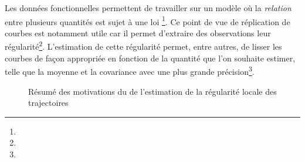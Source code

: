 
Les données fonctionnelles permettent de travailler sur un modèle où la \emph{relation} entre plusieurs quantités est sujet à une loi \footnote{}. Ce point de vue de réplication de courbes est notamment utile car il permet d'extraire des observations leur régularité\footnote{}. L'estimation de cette régularité permet, entre autres, de lisser les courbes de façon appropriée en fonction de la quantité que l'on souhaite estimer, telle que la moyenne et la covariance avec une plus grande précision\footnote{}.

\noindent\begin{figure}[H]
	\centering
	\caption{Résumé des motivations du de l'estimation de la régularité locale des trajectoires}
	\label{fig:sketch_resume_informel}
\end{figure}
